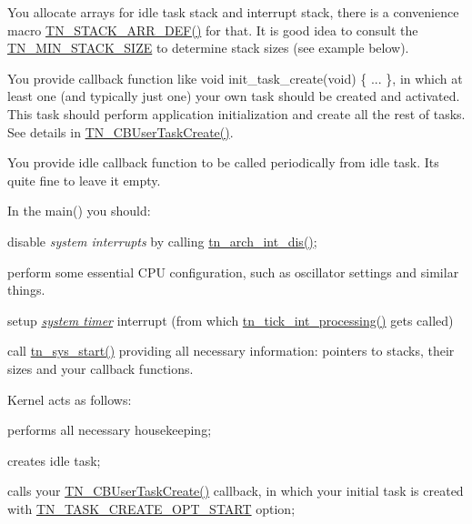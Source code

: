 \begin{DoxyItemize}
\item You allocate arrays for idle task stack and interrupt stack, there is a convenience macro {\ttfamily \hyperlink{tn__sys_8h_ad61af0f0e9ab96bdf1ac1bf1e03e3c75}{T\+N\+\_\+\+S\+T\+A\+C\+K\+\_\+\+A\+R\+R\+\_\+\+D\+E\+F()}} for that. It is good idea to consult the {\ttfamily \hyperlink{tn__arch__example_8h_ad465f81e8ea15a530747b1147dbe4605}{T\+N\+\_\+\+M\+I\+N\+\_\+\+S\+T\+A\+C\+K\+\_\+\+S\+I\+ZE}} to determine stack sizes (see example below).
\item You provide callback function like {\ttfamily void init\+\_\+task\+\_\+create(void) \{ ... \}}, in which at least one (and typically just one) your own task should be created and activated. This task should perform application initialization and create all the rest of tasks. See details in {\ttfamily \hyperlink{tn__sys_8h_aaa9bbc6c586cf6ce8d982b8d79bc27d6}{T\+N\+\_\+\+C\+B\+User\+Task\+Create()}}.
\item You provide idle callback function to be called periodically from idle task. It\textquotesingle{}s quite fine to leave it empty.
\item In the {\ttfamily main()} you should\+:
\begin{DoxyItemize}
\item disable {\itshape system interrupts} by calling {\ttfamily \hyperlink{tn__arch_8h_a2b3f2294ac42a599662c573394b14c75}{tn\+\_\+arch\+\_\+int\+\_\+dis()}};
\item perform some essential C\+PU configuration, such as oscillator settings and similar things.
\item setup {\itshape \hyperlink{time_ticks}{system timer}} interrupt (from which {\ttfamily \hyperlink{tn__sys_8h_aa44d297639e0520420890ef2bb7e2c1c}{tn\+\_\+tick\+\_\+int\+\_\+processing()}} gets called)
\item call {\ttfamily \hyperlink{tn__sys_8h_a62ab25d9d8ca01c02d368968f19e49bf}{tn\+\_\+sys\+\_\+start()}} providing all necessary information\+: pointers to stacks, their sizes and your callback functions.
\end{DoxyItemize}
\item Kernel acts as follows\+:
\begin{DoxyItemize}
\item performs all necessary housekeeping;
\item creates idle task;
\item calls your {\ttfamily \hyperlink{tn__sys_8h_aaa9bbc6c586cf6ce8d982b8d79bc27d6}{T\+N\+\_\+\+C\+B\+User\+Task\+Create()}} callback, in which your initial task is created with {\ttfamily \hyperlink{tn__tasks_8h_a8fa2ef577d6bd159b3fae559839f98d5a0c9352496e4465eb7e1b29dab7544acc}{T\+N\+\_\+\+T\+A\+S\+K\+\_\+\+C\+R\+E\+A\+T\+E\+\_\+\+O\+P\+T\+\_\+\+S\+T\+A\+RT}} option;

\end{DoxyItemize}
\end{DoxyItemize}
